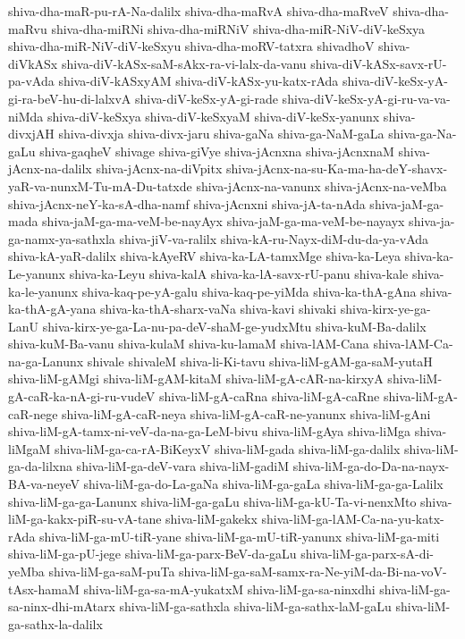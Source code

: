 {shiva-dha-maR-pu-rA-Na-dalilx
shiva-dha-maRvA
shiva-dha-maRveV
shiva-dha-maRvu
shiva-dha-miRNi
shiva-dha-miRNiV
shiva-dha-miR-NiV-diV-keSxya
shiva-dha-miR-NiV-diV-keSxyu
shiva-dha-moRV-tatxra
shivadhoV
shiva-diVkASx
shiva-diV-kASx-saM-sAkx-ra-vi-lalx-da-vanu
shiva-diV-kASx-savx-rU-pa-vAda
shiva-diV-kASxyAM
shiva-diV-kASx-yu-katx-rAda
shiva-diV-keSx-yA-gi-ra-beV-hu-di-lalxvA
shiva-diV-keSx-yA-gi-rade
shiva-diV-keSx-yA-gi-ru-va-va-niMda
shiva-diV-keSxya
shiva-diV-keSxyaM
shiva-diV-keSx-yanunx
shiva-divxjAH
shiva-divxja
shiva-divx-jaru
shiva-gaNa
shiva-ga-NaM-gaLa
shiva-ga-Na-gaLu
shiva-gaqheV
shivage
shiva-giVye
shiva-jAcnxna
shiva-jAcnxnaM
shiva-jAcnx-na-dalilx
shiva-jAcnx-na-diVpitx
shiva-jAcnx-na-su-Ka-ma-ha-deY-shavx-yaR-va-nunxM-Tu-mA-Du-tatxde
shiva-jAcnx-na-vanunx
shiva-jAcnx-na-veMba
shiva-jAcnx-neY-ka-sA-dha-namf
shiva-jAcnxni
shiva-jA-ta-nAda
shiva-jaM-ga-mada
shiva-jaM-ga-ma-veM-be-nayAyx
shiva-jaM-ga-ma-veM-be-nayayx
shiva-ja-ga-namx-ya-sathxla
shiva-jiV-va-ralilx
shiva-kA-ru-Nayx-diM-du-da-ya-vAda
shiva-kA-yaR-dalilx
shiva-kAyeRV
shiva-ka-LA-tamxMge
shiva-ka-Leya
shiva-ka-Le-yanunx
shiva-ka-Leyu
shiva-kalA
shiva-ka-lA-savx-rU-panu
shiva-kale
shiva-ka-le-yanunx
shiva-kaq-pe-yA-galu
shiva-kaq-pe-yiMda
shiva-ka-thA-gAna
shiva-ka-thA-gA-yana
shiva-ka-thA-sharx-vaNa
shiva-kavi
shivaki
shiva-kirx-ye-ga-LanU
shiva-kirx-ye-ga-La-nu-pa-deV-shaM-ge-yudxMtu
shiva-kuM-Ba-dalilx
shiva-kuM-Ba-vanu
shiva-kulaM
shiva-ku-lamaM
shiva-lAM-Cana
shiva-lAM-Ca-na-ga-Lanunx
shivale
shivaleM
shiva-li-Ki-tavu
shiva-liM-gAM-ga-saM-yutaH
shiva-liM-gAMgi
shiva-liM-gAM-kitaM
shiva-liM-gA-cAR-na-kirxyA
shiva-liM-gA-caR-ka-nA-gi-ru-vudeV
shiva-liM-gA-caRna
shiva-liM-gA-caRne
shiva-liM-gA-caR-nege
shiva-liM-gA-caR-neya
shiva-liM-gA-caR-ne-yanunx
shiva-liM-gAni
shiva-liM-gA-tamx-ni-veV-da-na-ga-LeM-bivu
shiva-liM-gAya
shiva-liMga
shiva-liMgaM
shiva-liM-ga-ca-rA-BiKeyxV
shiva-liM-gada
shiva-liM-ga-dalilx
shiva-liM-ga-da-lilxna
shiva-liM-ga-deV-vara
shiva-liM-gadiM
shiva-liM-ga-do-Da-na-nayx-BA-va-neyeV
shiva-liM-ga-do-La-gaNa
shiva-liM-ga-gaLa
shiva-liM-ga-ga-Lalilx
shiva-liM-ga-ga-Lanunx
shiva-liM-ga-gaLu
shiva-liM-ga-kU-Ta-vi-nenxMto
shiva-liM-ga-kakx-piR-su-vA-tane
shiva-liM-gakekx
shiva-liM-ga-lAM-Ca-na-yu-katx-rAda
shiva-liM-ga-mU-tiR-yane
shiva-liM-ga-mU-tiR-yanunx
shiva-liM-ga-miti
shiva-liM-ga-pU-jege
shiva-liM-ga-parx-BeV-da-gaLu
shiva-liM-ga-parx-sA-di-yeMba
shiva-liM-ga-saM-puTa
shiva-liM-ga-saM-samx-ra-Ne-yiM-da-Bi-na-voV-tAsx-hamaM
shiva-liM-ga-sa-mA-yukatxM
shiva-liM-ga-sa-ninxdhi
shiva-liM-ga-sa-ninx-dhi-mAtarx
shiva-liM-ga-sathxla
shiva-liM-ga-sathx-laM-gaLu
shiva-liM-ga-sathx-la-dalilx
}
